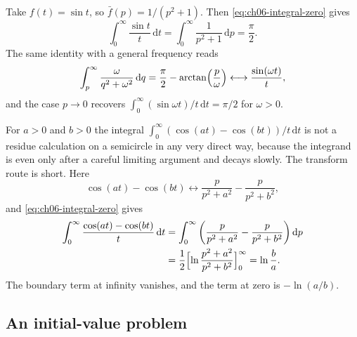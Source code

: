 \begin{example}
Take $f(t)=\sin t$, so $\bar f(p)=1/(p^2+1)$. Then \eqref{eq:ch06-integral-zero} gives
\begin{equation}
\int_0^{\infty}\frac{\sin t}{t}\,\mathrm{d}t
=\int_0^{\infty}\frac{1}{p^2+1}\,\mathrm{d}p
=\frac{\pi}{2}.
\end{equation}
The same identity with a general frequency reads
\begin{equation}
\int_p^{\infty}\frac{\omega}{q^2+\omega^2}\,\mathrm{d}q
=\frac{\pi}{2}-\arctan\Bigl(\frac{p}{\omega}\Bigr)
\longleftrightarrow\frac{\sin(\omega t)}{t},
\end{equation}
and the case $p\to 0$ recovers $\int_0^{\infty}(\sin\omega t)/t\,\mathrm{d}t=\pi/2$ for $\omega>0$.
\end{example}

\begin{example}
For $a>0$ and $b>0$ the integral $\int_0^{\infty}(\cos(at)-\cos(bt))/t\,\mathrm{d}t$ is not a residue calculation on a semicircle in any very direct way, because the integrand is even only after a careful limiting argument and decays slowly. The transform route is short. Here
\begin{equation}
\cos(at)-\cos(bt)
\longleftrightarrow
\frac{p}{p^2+a^2}-\frac{p}{p^2+b^2},
\end{equation}
and \eqref{eq:ch06-integral-zero} gives
\begin{align}
\int_0^{\infty}\frac{\cos(at)-\cos(bt)}{t}\,\mathrm{d}t
&=\int_0^{\infty}
\left(\frac{p}{p^2+a^2}-\frac{p}{p^2+b^2}\right)\mathrm{d}p
\nonumber\\
&=\frac12\Bigl[\ln\frac{p^2+a^2}{p^2+b^2}\Bigr]_0^{\infty}
=\ln\frac{b}{a}.
\end{align}
The boundary term at infinity vanishes, and the term at zero is $-\ln(a/b)$.
\end{example}

\subsection{An initial-value problem}

